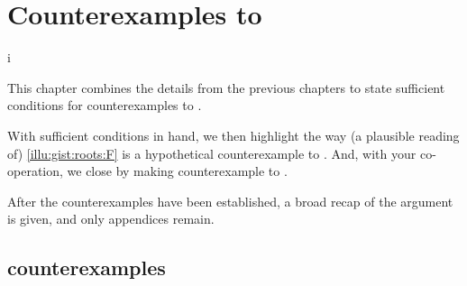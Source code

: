 \chapter{Counterexamples to \issueInclusion{}}
\label{cha:ces}


i\begin{note}
  This chapter combines the details from the previous chapters to state sufficient conditions for counterexamples to \issueInclusion{}.

  With sufficient conditions in hand, we then highlight the way (a plausible reading of) \autoref{illu:gist:roots:F} is a hypothetical counterexample to \issueInclusion{}.
  And, with your co-operation, we close by making counterexample to \issueInclusion{}.
\end{note}

\begin{note}
  After the counterexamples have been established, a broad recap of the argument is given, and only appendices remain.
\end{note}



\section{ counterexamples}
\label{sec:counterexamples}



